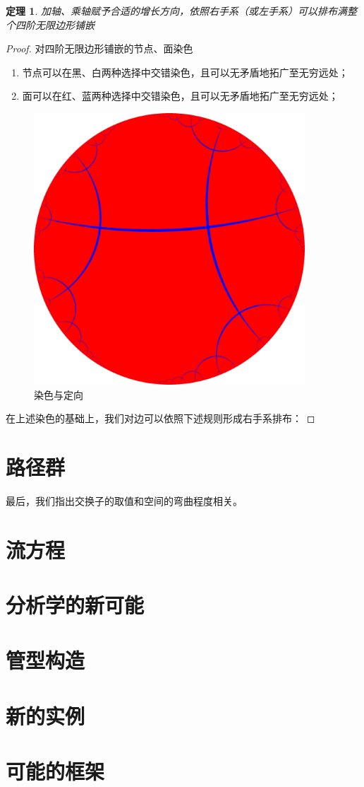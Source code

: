 \documentclass[a4paper,12pt]{article}
\newtheorem{theorem}{定理}
\begin{document}
\begin{theorem}
    加轴、乘轴赋予合适的增长方向，依照右手系（或左手系）可以排布满整个四阶无限边形铺嵌
\end{theorem}

\begin{proof}
对四阶无限边形铺嵌的节点、面染色
\begin{enumerate}
    \item 节点可以在黑、白两种选择中交错染色，且可以无矛盾地拓广至无穷远处；
    \item 面可以在红、蓝两种选择中交错染色，且可以无矛盾地拓广至无穷远处；
\end{enumerate}

\begin{figure}[ht]
\centering
\includegraphics[width=4in]{images/H2_tiling_24i-1.png}
\caption{染色与定向}
\end{figure}

在上述染色的基础上，我们对边可以依照下述规则形成右手系排布：

\end{proof}

\section{路径群}

最后，我们指出交换子的取值和空间的弯曲程度相关。

\section{流方程}

\section{分析学的新可能}

\section{管型构造}

\section{新的实例}

\section{可能的框架}

\newpage
{}
{}


\end{document}
